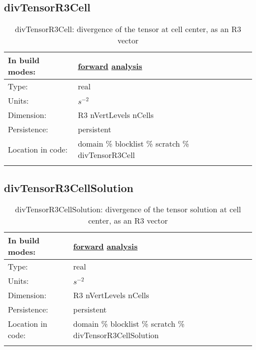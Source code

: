 \subsection[divTensorR3Cell]{divTensorR3Cell}
\label{subsec:var_sec_scratch_divTensorR3Cell}
\begin{center}
\begin{longtable}{| p{2.0in} | p{4.0in} |}
        \hline 
        In build modes: & \hyperref[subsec:forward_var_tab_scratch]{forward} \hyperref[subsec:analysis_var_tab_scratch]{analysis} \\
        \hline 
        Type: & real \\
        \hline 
        Units: & $s^{-2}$ \\
        \hline 
        Dimension: & R3 nVertLevels nCells \\
        \hline 
        Persistence: & persistent \\
        \hline 
		 Location in code: & domain \% blocklist \% scratch \% divTensorR3Cell \\
		 \hline 
    \caption{divTensorR3Cell: divergence of the tensor at cell center, as an R3 vector}
\end{longtable}
\end{center}
\subsection[divTensorR3CellSolution]{divTensorR3CellSolution}
\label{subsec:var_sec_scratch_divTensorR3CellSolution}
\begin{center}
\begin{longtable}{| p{2.0in} | p{4.0in} |}
        \hline 
        In build modes: & \hyperref[subsec:forward_var_tab_scratch]{forward} \hyperref[subsec:analysis_var_tab_scratch]{analysis} \\
        \hline 
        Type: & real \\
        \hline 
        Units: & $s^{-2}$ \\
        \hline 
        Dimension: & R3 nVertLevels nCells \\
        \hline 
        Persistence: & persistent \\
        \hline 
		 Location in code: & domain \% blocklist \% scratch \% divTensorR3CellSolution \\
		 \hline 
    \caption{divTensorR3CellSolution: divergence of the tensor solution at cell center, as an R3 vector}
\end{longtable}
\end{center}
